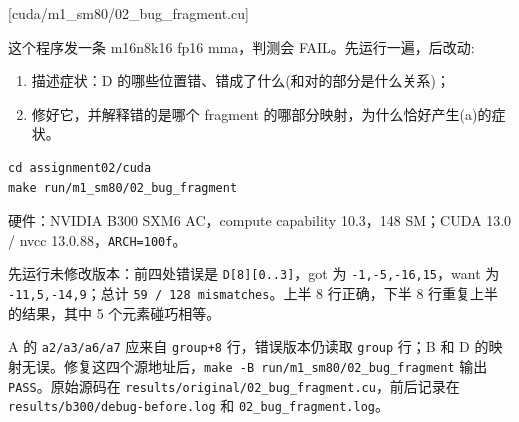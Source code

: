 \documentclass[11pt,a4paper,fontset=fandol]{ctexart}
\begin{document}
[cuda/m1\_sm80/02\_bug\_fragment.cu]

这个程序发一条 m16n8k16 fp16 mma，判测会 FAIL。先运行一遍，后改动:

\begin{enumerate}
\def\labelenumi{(\alph{enumi})}
\item
  描述症状：D 的哪些位置错、错成了什么(和对的部分是什么关系)；
\item
  修好它，并解释错的是哪个 fragment
  的哪部分映射，为什么恰好产生(a)的症状。
\end{enumerate}

\begin{verbatim}
cd assignment02/cuda
make run/m1_sm80/02_bug_fragment
\end{verbatim}

\begin{answer}

硬件：NVIDIA B300 SXM6 AC，compute capability 10.3，148 SM；CUDA 13.0 /
nvcc 13.0.88，\texttt{ARCH=\allowbreak{}100f}。

先运行未修改版本：前四处错误是
\texttt{D{[}8{]}{[}0.\allowbreak{}.\allowbreak{}3{]}}，got 为
\texttt{-\allowbreak{}1,\allowbreak{}-\allowbreak{}5,\allowbreak{}-\allowbreak{}16,\allowbreak{}15}，want
为
\texttt{-\allowbreak{}11,\allowbreak{}5,\allowbreak{}-\allowbreak{}14,\allowbreak{}9}；总计
\texttt{59\ /\allowbreak{}\ 128\ mismatches}。上半 8 行正确，下半 8
行重复上半的结果，其中 5 个元素碰巧相等。

A 的 \texttt{a2/\allowbreak{}a3/\allowbreak{}a6/\allowbreak{}a7} 应来自
\texttt{group+8} 行，错误版本仍读取 \texttt{group} 行；B 和 D
的映射无误。修复这四个源地址后，\texttt{make\ -\allowbreak{}B\ run/\allowbreak{}m1\_\allowbreak{}sm80/\allowbreak{}02\_\allowbreak{}bug\_\allowbreak{}fragment}
输出 \texttt{PASS}。原始源码在
\texttt{results/\allowbreak{}original/\allowbreak{}02\_\allowbreak{}bug\_\allowbreak{}fragment.\allowbreak{}cu}，前后记录在
\texttt{results/\allowbreak{}b300/\allowbreak{}debug-\allowbreak{}before.\allowbreak{}log}
和
\texttt{02\_\allowbreak{}bug\_\allowbreak{}fragment.\allowbreak{}log}。

\end{answer}
\end{document}
